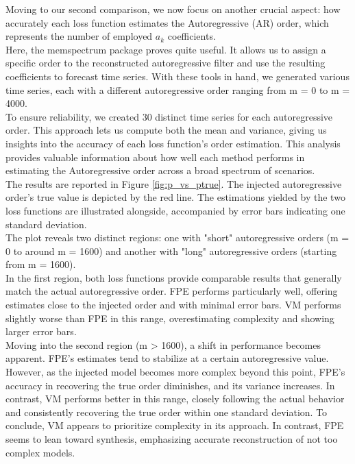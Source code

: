 \documentclass{aa}
\begin{document}
Moving to our second comparison, we now focus on another crucial aspect: how accurately each loss function estimates the Autoregressive (AR) order, which represents the number of employed $a_k$ coefficients. \\ 
Here, the memspectrum package proves quite useful. It allows us to assign a specific order to the reconstructed autoregressive filter and use the resulting coefficients to forecast time series. With these tools in hand, we generated various time series, each with a different autoregressive order ranging from m = 0 to m = 4000.\\ 
To ensure reliability, we created 30 distinct time series for each autoregressive order. This approach lets us compute both the mean and variance, giving us insights into the accuracy of each loss function's order estimation. This analysis provides valuable information about how well each method performs in estimating the Autoregressive order across a broad spectrum of scenarios. \\ 
The results are reported in Figure \ref{fig:p_vs_ptrue}. The injected autoregressive order's true value is depicted by the red line. The estimations yielded by the two loss functions are illustrated alongside, accompanied by error bars indicating one standard deviation. \\ 
The plot reveals two distinct regions: one with "short" autoregressive orders (m = 0 to around m = 1600) and another with "long" autoregressive orders (starting from m = 1600).\\ 
In the first region, both loss functions provide comparable results that generally match the actual autoregressive order. FPE performs particularly well, offering estimates close to the injected order and with minimal error bars. VM performs slightly worse than FPE in this range, overestimating complexity and showing larger error bars.\\ 
Moving into the second region (m > 1600), a shift in performance becomes apparent. FPE's estimates tend to stabilize at a certain autoregressive value. However, as the injected model becomes more complex beyond this point, FPE's accuracy in recovering the true order diminishes, and its variance increases. In contrast, VM performs better in this range, closely following the actual behavior and consistently recovering the true order within one standard deviation.
To conclude, VM appears to prioritize complexity in its approach. In contrast, FPE seems to lean toward synthesis, emphasizing accurate reconstruction of not too complex models. 
\end{document}
